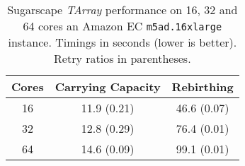 \begin{table}
	\centering
%   		
  	
%		
%		
 
  	\begin{tabular}{ c || c | c }
        Cores  & Carrying Capacity  & Rebirthing    \\ \hline \hline 
    	    16     & 11.9 (0.21)        & 46.6 (0.07)   \\ \hline
   		32     & 12.8 (0.29)        & 76.4 (0.01)   \\ \hline
   		64     & 14.6 (0.09)        & 99.1 (0.01)   \\ \hline \hline
   	\end{tabular}

  	\caption{Sugarscape \textit{TArray} performance on 16, 32 and 64 cores an Amazon EC \texttt{m5ad.16xlarge} instance. Timings in seconds (lower is better). Retry ratios in parentheses.}
	\label{tab:sug_varying_cores_amazon}
\end{table}

